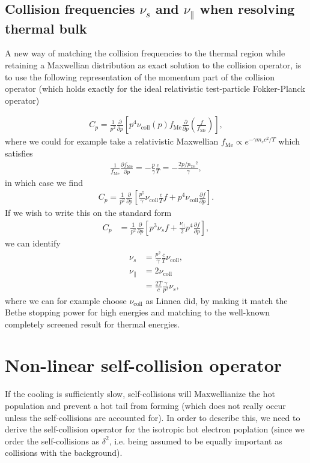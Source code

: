 \documentclass[11pt,a4paper]{article}
\newcommand{\sub}[1]{\ensuremath{_{\text{#1}}}}
\begin{document}
\subsection{Collision frequencies $\nu_s$ and $\nu_\parallel$ when resolving thermal bulk}
A new way of matching the collision frequencies to the thermal region while retaining a Maxwellian distribution as exact solution to the collision operator, is to use the following representation of the momentum part of the collision operator (which holds exactly for the ideal relativistic test-particle Fokker-Planck operator)

\begin{align}
C_p = \frac{1}{p^2}\frac{\partial}{\partial p} \left[ p^4 \nu\sub{coll}(p) f\sub{Me}\frac{\partial}{\partial p}\left(\frac{f}{f\sub{Me}}\right)\right],
\end{align}
where we could for example take a relativistic Maxwellian $f\sub{Me}\propto e^{-\gamma  m_e c^2/T}$ which satisfies 
\begin{align}
\frac{1}{f\sub{Me}}\frac{\partial f\sub{Me}}{\partial p} = -\frac{p}{\gamma}\frac{c}{T} = -\frac{2 p/p\sub{Te}^2}{\gamma}, 
\end{align}
in which case we find
\begin{align}
C_p = \frac{1}{p^2}\frac{\partial}{\partial p} \left[ \frac{p^5}{\gamma}\nu\sub{coll} \frac{c}{T} f  + p^4 \nu\sub{coll} \frac{\partial f}{\partial p}\right].
\end{align}
If we wish to write this on the standard form
\begin{align}
C_p &=\frac{1}{p^2}\frac{\partial}{\partial p} \left[ p^3\nu_s f + \frac{\nu_\parallel}{2}p^4\frac{\partial f}{\partial p}\right],
\end{align}
we can identify
\begin{align}
\nu_s &= \frac{p^2}{\gamma} \frac{c}{T}\nu\sub{coll}, \nonumber \\
\nu_\parallel &= 2\nu\sub{coll} \nonumber \\
&= \frac{2T}{c}\frac{\gamma}{p^2}\nu_s,
\end{align}
where we can for example choose $\nu\sub{coll}$ as Linnea did, by making it match the Bethe stopping power for high energies and matching to the well-known completely screened result for thermal energies.




\section{Non-linear self-collision operator}
If the cooling is sufficiently slow, self-collisions will Maxwellianize the hot population and prevent a hot tail from forming (which does not really occur unless the self-collisions are accounted for). In order to describe this, we need to derive the self-collision operator for the isotropic hot electron poplation (since we order the self-collisions as $\delta^2$, i.e. being assumed to be equally important as collisions with the background). 
\end{document}
